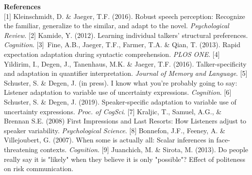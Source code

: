 \documentclass[11pt,a4paper]{article}
\begin{document}
\vspace{1em}
\noindent \textbf{References} \\
{\tiny \noindent $[$1$]$ Kleinschmidt, D. \& Jaeger, T.F. (2016). Robust speech perception: Recognize the familiar, generalize to the similar, and adapt to the novel. \textit{Psychological Review}. $[$2$]$ Kamide, Y. (2012). Learning individual talkers' structural preferences. \textit{Cognition}. $[$3$]$~Fine, A.B., Jaeger, T.F., Farmer, T.A. \& Qian, T. (2013). Rapid expectation adaptation during syntactic comprehension. \textit{PLOS ONE}. $[$4$]$ Yildirim, I., Degen, J., Tanenhaus, M.K. \& Jaeger, T.F. (2016). Talker-specificity and adaptation in quantifier interpretation. \textit{Journal of Memory and Language}. $[$5$]$  Schuster, S. \& Degen, J. (in press). I know what you're probably going to say: Listener adaptation to variable use of uncertainty expressions. \textit{Cognition}. $[$6$]$  Schuster, S. \& Degen, J. (2019). Speaker-specific adaptation to variable use of uncertainty expressions. \textit{Proc. of CogSci}. $[$7$]$  Kraljic, T., Samuel, A.G., \& Brennan S.E. (2008) First Impressions and Last Resorts: How Listeners adjust to speaker variability. \textit{Psychological Science}. $[$8$]$   Bonnefon, J.F., Feeney, A. \& Villejoubert, G. (2007). When some is actually all: Scalar inferences in face-threatening contexts. \textit{Cognition}. $[$9$]$  Juanchich, M. \& Sirota, M. (2013). Do people really say it is "likely" when they believe it is only "possible"? Effect of politeness on risk communication.
}
\end{document}
